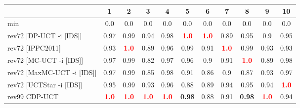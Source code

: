 \documentclass{article}
\begin{document}
\begin{tabular}{|l|r@{$\pm$}rr@{$\pm$}rr@{$\pm$}rr@{$\pm$}rr@{$\pm$}rr@{$\pm$}rr@{$\pm$}rr@{$\pm$}rr@{$\pm$}rr@{$\pm$}r|}
\hline

& \multicolumn{2}{c}{1}
& \multicolumn{2}{c}{2}
& \multicolumn{2}{c}{3}
& \multicolumn{2}{c}{4}
& \multicolumn{2}{c}{5}
& \multicolumn{2}{c}{6}
& \multicolumn{2}{c}{7}
& \multicolumn{2}{c}{8}
& \multicolumn{2}{c}{9}
& \multicolumn{2}{c|}{10}
\\
\hline
\hline
min
& \multicolumn{2}{c}{0.0}
& \multicolumn{2}{c}{0.0}
& \multicolumn{2}{c}{0.0}
& \multicolumn{2}{c}{0.0}
& \multicolumn{2}{c}{0.0}
& \multicolumn{2}{c}{0.0}
& \multicolumn{2}{c}{0.0}
& \multicolumn{2}{c}{0.0}
& \multicolumn{2}{c}{0.0}
& \multicolumn{2}{c|}{0.0}
\\
rev72 [DP-UCT -i [IDS]]
& \multicolumn{2}{c}{0.97}
& \multicolumn{2}{c}{0.99}
& \multicolumn{2}{c}{0.94}
& \multicolumn{2}{c}{0.98}
& \multicolumn{2}{c}{\textbf{\textcolor{red}{1.0}}}
& \multicolumn{2}{c}{\textbf{\textcolor{red}{1.0}}}
& \multicolumn{2}{c}{0.89}
& \multicolumn{2}{c}{0.95}
& \multicolumn{2}{c}{0.9}
& \multicolumn{2}{c|}{0.95}
\\
rev72 [IPPC2011]
& \multicolumn{2}{c}{0.93}
& \multicolumn{2}{c}{\textbf{\textcolor{red}{1.0}}}
& \multicolumn{2}{c}{0.89}
& \multicolumn{2}{c}{0.96}
& \multicolumn{2}{c}{0.99}
& \multicolumn{2}{c}{0.91}
& \multicolumn{2}{c}{\textbf{\textcolor{red}{1.0}}}
& \multicolumn{2}{c}{0.99}
& \multicolumn{2}{c}{0.93}
& \multicolumn{2}{c|}{0.93}
\\
rev72 [MC-UCT -i [IDS]]
& \multicolumn{2}{c}{0.97}
& \multicolumn{2}{c}{0.99}
& \multicolumn{2}{c}{0.82}
& \multicolumn{2}{c}{0.97}
& \multicolumn{2}{c}{0.96}
& \multicolumn{2}{c}{0.9}
& \multicolumn{2}{c}{0.91}
& \multicolumn{2}{c}{\textbf{\textcolor{red}{1.0}}}
& \multicolumn{2}{c}{0.89}
& \multicolumn{2}{c|}{0.98}
\\
rev72 [MaxMC-UCT -i [IDS]]
& \multicolumn{2}{c}{0.97}
& \multicolumn{2}{c}{0.99}
& \multicolumn{2}{c}{0.85}
& \multicolumn{2}{c}{0.98}
& \multicolumn{2}{c}{0.91}
& \multicolumn{2}{c}{0.86}
& \multicolumn{2}{c}{0.9}
& \multicolumn{2}{c}{0.87}
& \multicolumn{2}{c}{0.93}
& \multicolumn{2}{c|}{0.97}
\\
rev72 [UCTStar -i [IDS]]
& \multicolumn{2}{c}{0.95}
& \multicolumn{2}{c}{0.99}
& \multicolumn{2}{c}{0.93}
& \multicolumn{2}{c}{0.96}
& \multicolumn{2}{c}{0.88}
& \multicolumn{2}{c}{0.89}
& \multicolumn{2}{c}{0.94}
& \multicolumn{2}{c}{0.95}
& \multicolumn{2}{c}{0.94}
& \multicolumn{2}{c|}{\textbf{\textcolor{red}{1.0}}}
\\
\hline
rev99 CDP-UCT
& \multicolumn{2}{c}{\textbf{\textcolor{red}{1.0}}}
& \multicolumn{2}{c}{\textbf{\textcolor{red}{1.0}}}
& \multicolumn{2}{c}{\textbf{\textcolor{red}{1.0}}}
& \multicolumn{2}{c}{\textbf{\textcolor{red}{1.0}}}
& \multicolumn{2}{c}{\textbf{0.98}}
& \multicolumn{2}{c}{0.88}
& \multicolumn{2}{c}{0.91}
& \multicolumn{2}{c}{\textbf{0.98}}
& \multicolumn{2}{c}{\textbf{\textcolor{red}{1.0}}}
& \multicolumn{2}{c|}{0.94}
\\
\hline
\end{tabular}%
\end{document}
